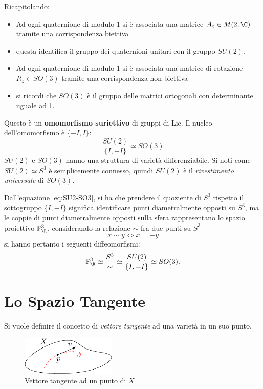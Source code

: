 \documentclass[10pt, letterpaper]{report}
\begin{document}
Ricapitolando:\begin{itemize}
    \item Ad ogni quaternione di modulo 1 si è associata una matrice $A_z\in M(2,\C)$ tramite una corrispondenza biettiva
    \item questa identifica il gruppo dei quaternioni unitari con il gruppo $SU(2)$.
    \item Ad ogni quaternione di modulo 1 si è associata una matrice di rotazione $R_z\in SO(3)$ tramite una corrispondenza non biettiva
    \item si ricordi che $SO(3)$ è il gruppo delle matrici ortogonali con determinante uguale ad 1.
\end{itemize}
Questo è un \textbf{omomorfismo suriettivo} di gruppi di Lie. Il nucleo dell'omomorfismo è $\{-I,I\}$:\begin{equation}\label{eq:SU2-SO3}
    \frac{SU(2)}{\{I,-I\}}\simeq SO(3)
\end{equation}
$SU(2)$ e $SO(3)$ hanno una struttura di varietà differenziabile. Si noti come $SU(2)\simeq S^3$ è semplicemente connesso, quindi $SU(2)$ è il \textit{rivestimento universale} di $SO(3)$.\bigskip

Dall'equazione \eqref{eq:SU2-SO3}, si ha che prendere il quoziente di $S^3$ rispetto il sottogruppo $\{I,-I\}$ significa identificare punti diametralmente opposti su $S^3$, ma le coppie di punti diametralmente opposti sulla sfera rappresentano lo spazio proiettivo $\mathbb P^3_\R$, considerando la relazione $\sim$ fra due punti su $S^3$\begin{equation}
x\sim y\iff x=-y
\end{equation} si hanno pertanto i seguenti diffeomorfismi:\begin{equation}
    \mathbb  P^3_\R\simeq \frac{S^3}{\sim}\simeq  \frac{SU(2)}{\{I,-I\}}\simeq SO(3).
\end{equation}



\chapter{Lo Spazio Tangente}
Si vuole definire il concetto di \textit{vettore tangente} ad una varietà in un suo punto.
\begin{figure}[h!]
    \center
    \includegraphics[width=0.4\textwidth ]{images/vettore_tangente.eps}
    \caption{Vettore tangente ad un punto di $X$}
    \label{img:vec_tang}
\end{figure}
\end{document}
